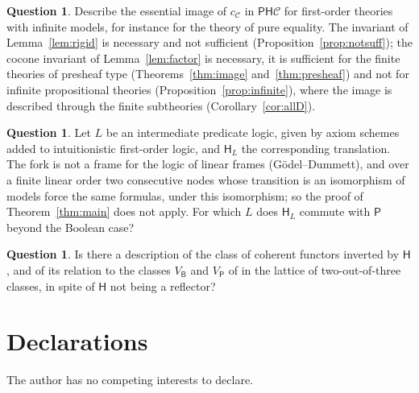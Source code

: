 \documentclass[11pt]{amsart}
\theoremstyle{definition}
\newtheorem{que}[thm]{Question}
\newcommand{\PP}{\mathsf P}
\newcommand{\BB}{\mathsf B}
\newcommand{\HH}{\mathsf H}
\newcommand{\cC}{\mathcal C}
\begin{document}
\begin{que}\label{que:image}
Describe the essential image of $c_\cC$ in $\PP\HH\cC$ for first-order
theories with infinite models, for instance for the theory of pure
equality. The invariant of Lemma~\ref{lem:rigid} is necessary and not
sufficient (Proposition~\ref{prop:notsuff}); the cocone invariant of
Lemma~\ref{lem:factor} is necessary, it is sufficient for the finite
theories of presheaf type (Theorems~\ref{thm:image}
and~\ref{thm:presheaf}) and not for infinite propositional theories
(Proposition~\ref{prop:infinite}), where the image is described through
the finite subtheories (Corollary~\ref{cor:allD}).
\end{que}

\begin{que}
Let $L$ be an intermediate predicate logic, given by axiom schemes
added to intuitionistic first-order logic, and $\HH_L$ the
corresponding translation. The fork is not a frame for the logic of linear frames
(G\"odel--Dummett), and over a finite linear order two consecutive
nodes whose transition is an isomorphism of models force the same
formulas, under this isomorphism; so the proof of
Theorem~\ref{thm:main} does not apply. For which $L$ does $\HH_L$
commute with $\PP$ beyond the Boolean case?
\end{que}

\begin{que}
Is there a description of the class of coherent functors inverted by
$\HH$, and of its relation to the classes $V_\BB$ and $V_\PP$ of
\cite{Morley} in the lattice of two-out-of-three classes, in spite of
$\HH$ not being a reflector?
\end{que}

\section*{Declarations}
The author has no competing interests to declare.
\end{document}
